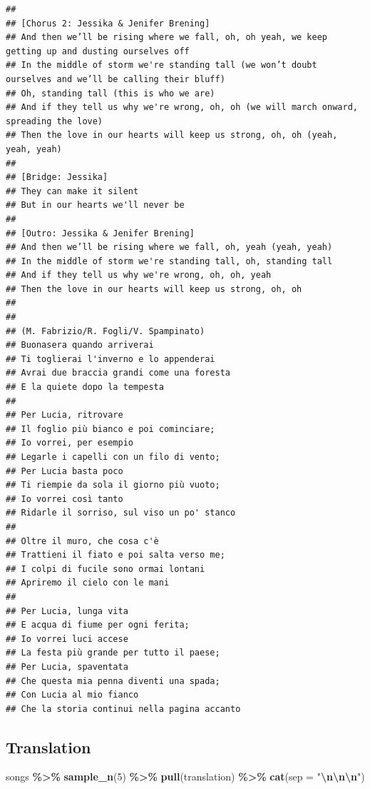 \documentclass[
]{article}
\newenvironment{Shaded}{\begin{snugshade}}{\end{snugshade}}
\newcommand{\AttributeTok}[1]{\textcolor[rgb]{0.13,0.29,0.53}{#1}}
\newcommand{\DecValTok}[1]{\textcolor[rgb]{0.00,0.00,0.81}{#1}}
\newcommand{\FunctionTok}[1]{\textcolor[rgb]{0.13,0.29,0.53}{\textbf{#1}}}
\newcommand{\NormalTok}[1]{#1}
\newcommand{\SpecialCharTok}[1]{\textcolor[rgb]{0.81,0.36,0.00}{\textbf{#1}}}
\newcommand{\StringTok}[1]{\textcolor[rgb]{0.31,0.60,0.02}{#1}}
\begin{document}
\begin{verbatim}
## 
## [Chorus 2: Jessika & Jenifer Brening]
## And then we’ll be rising where we fall, oh, oh yeah, we keep getting up and dusting ourselves off
## In the middle of storm we're standing tall (we won’t doubt ourselves and we’ll be calling their bluff)
## Oh, standing tall (this is who we are)
## And if they tell us why we're wrong, oh, oh (we will march onward, spreading the love)
## Then the love in our hearts will keep us strong, oh, oh (yeah, yeah, yeah)
## 
## [Bridge: Jessika]
## They can make it silent
## But in our hearts we'll never be
## 
## [Outro: Jessika & Jenifer Brening]
## And then we’ll be rising where we fall, oh, yeah (yeah, yeah)
## In the middle of storm we're standing tall, oh, standing tall
## And if they tell us why we're wrong, oh, oh, yeah
## Then the love in our hearts will keep us strong, oh, oh
## 
## 
## (M. Fabrizio/R. Fogli/V. Spampinato)
## Buonasera quando arriverai
## Ti toglierai l'inverno e lo appenderai
## Avrai due braccia grandi come una foresta
## E la quiete dopo la tempesta
## 
## Per Lucia, ritrovare
## Il foglio più bianco e poi cominciare;
## Io vorrei, per esempio
## Legarle i capelli con un filo di vento;
## Per Lucia basta poco
## Ti riempie da sola il giorno più vuoto;
## Io vorrei così tanto
## Ridarle il sorriso, sul viso un po' stanco
## 
## Oltre il muro, che cosa c'è
## Trattieni il fiato e poi salta verso me;
## I colpi di fucile sono ormai lontani
## Apriremo il cielo con le mani
## 
## Per Lucia, lunga vita
## E acqua di fiume per ogni ferita;
## Io vorrei luci accese
## La festa più grande per tutto il paese;
## Per Lucia, spaventata
## Che questa mia penna diventi una spada;
## Con Lucia al mio fianco
## Che la storia continui nella pagina accanto
\end{verbatim}

\subsection{Translation}\label{translation}

\begin{Shaded}
\begin{Highlighting}[]
\NormalTok{songs }\SpecialCharTok{\%\textgreater{}\%} 
  \FunctionTok{sample\_n}\NormalTok{(}\DecValTok{5}\NormalTok{) }\SpecialCharTok{\%\textgreater{}\%} 
  \FunctionTok{pull}\NormalTok{(translation) }\SpecialCharTok{\%\textgreater{}\%} 
  \FunctionTok{cat}\NormalTok{(}\AttributeTok{sep =} \StringTok{"}\SpecialCharTok{\textbackslash{}n\textbackslash{}n\textbackslash{}n}\StringTok{"}\NormalTok{)}
\end{Highlighting}
\end{Shaded}
\end{document}

